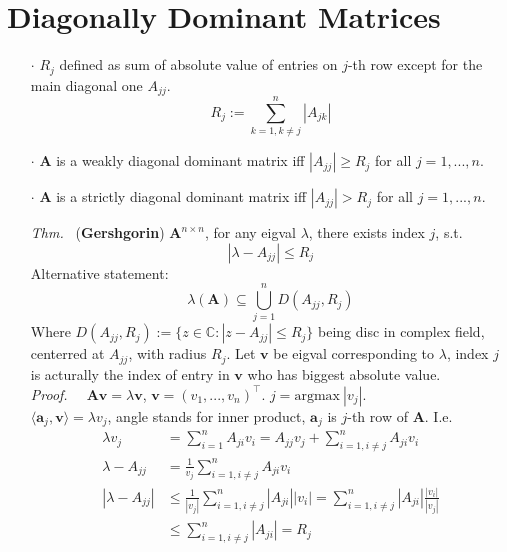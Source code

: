 \documentclass[a4paper, 11pt]{article}
\newcommand{\boxwidth}{430pt}
\begin{document}
\section{Diagonally Dominant Matrices}
\begin{itemize}
  \item[$\cdot$] $R_j$ defined as sum of absolute value of entries on $j$-th row except for the main diagonal one $A_{jj}$.
  $$
  R_j:=\sum_{k=1, k\ne j}^n |A_{jk}|
  $$
  \item[$\cdot$] $\pmb{A}$ is a weakly diagonal dominant matrix iff $|A_{jj}|\geq R_j$ for all $j=1,...,n$.
  \item[$\cdot$] $\pmb{A}$ is a strictly diagonal dominant matrix iff $|A_{jj}|>R_j$ for all $j=1,...,n$.
  \item[\textit{Thm.~}] (\textbf{Gershgorin}) $\pmb{A}^{n\times n}$, for any eigval $\lambda$, there exists index $j$, s.t.
  $$
  |\lambda - A_{jj}| \leq R_j
  $$
  Alternative statement:
  $$
  \lambda(\pmb{A}) \subseteq \bigcup_{j=1}^{n}D(A_{jj}, R_j)
  $$
  Where $D(A_{jj}, R_j):=\{z\in \mathbb{C}: |z-A_{jj}|\leq R_j\}$ being disc in complex field, centerred at $A_{jj}$, with radius $R_j$. Let $\pmb{v}$ be eigval corresponding to $\lambda$, index $j$ is acturally the index of entry in $\pmb{v}$ who has biggest absolute value.\\
  \textit{Proof.~~} $\pmb{Av}=\lambda \pmb{v}$, $\pmb{v}=(v_1, ..., v_n)^{\top}$. $j=\text{argmax}~|v_j|$.\\
  $\langle \pmb{a}_j, \pmb{v} \rangle = \lambda v_j$, angle stands for inner product, $\pmb{a}_j$ is $j$-th row of $\pmb{A}$. I.e.
  \begin{equation*}
    \begin{split}
    \lambda v_j &= \sum_{i=1}^n A_{ji} v_i = A_{jj}v_j +\sum_{i=1, i\ne j}^n A_{ji} v_i \\
    \lambda-A_{jj} &= \frac{1}{v_j}\sum_{i=1, i\ne j}^n A_{ji}v_i\\
    |\lambda-A_{jj}| &\leq \frac{1}{|v_j|}\sum_{i=1, i\ne j}^n |A_{ji}||v_i| =\sum_{i=1, i\ne j}^n |A_{ji}|\frac{|v_i|}{|v_j|}\\
    &\leq \sum_{i=1, i\ne j}^n |A_{ji}| = R_j
    \end{split}
  \end{equation*}
\end{itemize}
\fbox{
	\parbox{\boxwidth}{
	1
	}
}
\end{document}
